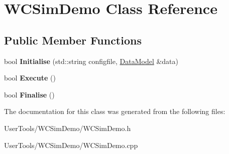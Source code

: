 \hypertarget{classWCSimDemo}{
\section{WCSimDemo Class Reference}
\label{classWCSimDemo}
}
\subsection*{Public Member Functions}
\begin{DoxyCompactItemize}
\item 
\hypertarget{classWCSimDemo_a0ec2651affef77275da0f9745f2f2e17}{
bool {\bfseries Initialise} (std::string configfile, \hyperlink{classDataModel}{DataModel} \&data)}
\label{classWCSimDemo_a0ec2651affef77275da0f9745f2f2e17}

\item 
\hypertarget{classWCSimDemo_afbfeba6ecafbac87f0e02c91f2f268c0}{
bool {\bfseries Execute} ()}
\label{classWCSimDemo_afbfeba6ecafbac87f0e02c91f2f268c0}

\item 
\hypertarget{classWCSimDemo_ac2f3315863ec62ce94ecef11099b40af}{
bool {\bfseries Finalise} ()}
\label{classWCSimDemo_ac2f3315863ec62ce94ecef11099b40af}

\end{DoxyCompactItemize}


The documentation for this class was generated from the following files:\begin{DoxyCompactItemize}
\item 
UserTools/WCSimDemo/WCSimDemo.h\item 
UserTools/WCSimDemo/WCSimDemo.cpp\end{DoxyCompactItemize}
